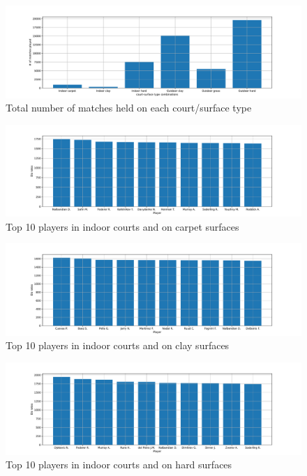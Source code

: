 \documentclass[preprint,aps,nofootinbib,a4paper,superscriptaddress,longbibliography,amsfonts,amssymb,amsmath,titlepage]{revtex4-2}
\begin{document}
%
%
\begin{figure}[h]
\includegraphics[width=\textwidth]{pictures/match-count-field-type-dist.pdf}
\caption{Total number of matches held on each court/surface type}
\label{match-count-field-type-dist}
\end{figure}
%
%
\begin{figure}[h]
\includegraphics[width=\textwidth]{pictures/top-10-elo-rates-indoor-carpet.pdf}
\caption{Top 10 players in indoor courts and on carpet surfaces}
\label{top-10-elo-rates-indoor-carpet}
\end{figure}
%
%
\begin{figure}[h]
\includegraphics[width=\textwidth]{pictures/top-10-elo-rates-indoor-clay.pdf}
\caption{Top 10 players in indoor courts and on clay surfaces}
\label{top-10-elo-rates-indoor-clay}
\end{figure}
%
%
\begin{figure}[h]
\includegraphics[width=\textwidth]{pictures/top-10-elo-rates-indoor-hard.pdf}
\caption{Top 10 players in indoor courts and on hard surfaces}
\label{top-10-elo-rates-indoor-hard}
\end{figure}
\end{document}
